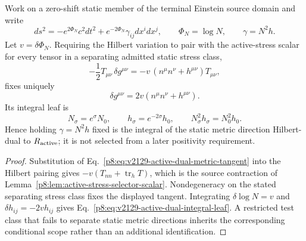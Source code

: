 \documentclass[12pt,a4paper]{article}
\begin{document}
\begin{lemma}
\label{p8:lem:v2129-active-stress-dual-static-leaf}
Work on a zero-shift static member of the terminal Einstein source domain and
write
\begin{equation}
\label{p8:eq:v2129-static-active-leaf-coordinates}
 ds^2=-e^{2\Phi_N}c^2dt^2+e^{-2\Phi_N}\gamma_{ij}dx^idx^j,
 \qquad
 \Phi_N=\log N,
 \qquad
 \gamma=N^2h .
\end{equation}
Let $v=\delta\Phi_N$.  Requiring the Hilbert variation to pair with the
active-stress scalar for every tensor in a separating admitted static stress
class,
\begin{equation}
 -\frac12T_{\mu\nu}\,\delta g^{\mu\nu}
 =-v\,(n^\mu n^\nu+h^{\mu\nu})T_{\mu\nu},
\label{p8:eq:v2129-active-hilbert-pairing}
\end{equation}
fixes uniquely
\begin{equation}
\boxed{\delta g^{\mu\nu}=2v(n^\mu n^\nu+h^{\mu\nu}).}
\label{p8:eq:v2129-active-dual-metric-tangent}
\end{equation}
Its integral leaf is
\begin{equation}
\boxed{
 N_\sigma=e^\sigma N_0,
 \qquad
 h_\sigma=e^{-2\sigma}h_0,
 \qquad
 N_\sigma^2h_\sigma=N_0^2h_0.}
\label{p8:eq:v2129-active-dual-integral-leaf}
\end{equation}
Hence holding $\gamma=N^2h$ fixed is the integral of the static metric
direction Hilbert-dual to $R_{\rm active}$; it is not selected from a later
positivity requirement.
\end{lemma}

\begin{proof}
Substitution of Eq.~\eqref{p8:eq:v2129-active-dual-metric-tangent} into the
Hilbert pairing gives
$-v(T_{nn}+\operatorname{tr}_hT)$, which is the source contraction of
Lemma~\ref{p8:lem:active-stress-selector-scalar}.  Nondegeneracy on the stated
separating stress class fixes the displayed tangent.  Integrating
$\delta\log N=v$ and $\delta h_{ij}=-2vh_{ij}$ gives
Eq.~\eqref{p8:eq:v2129-active-dual-integral-leaf}.  A restricted test class
that fails to separate static metric directions inherits the corresponding
conditional scope rather than an additional identification.
\end{proof}
\end{document}
